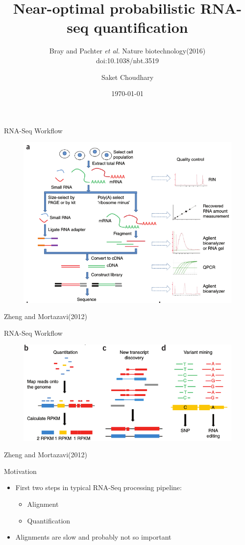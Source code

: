 \documentclass[10pt]{beamer}
\title{Near-optimal probabilistic
RNA-seq quantification}
\subtitle{Bray and Pachter \emph{et al.} Nature biotechnology(2016)\\ doi:10.1038/nbt.3519}
\date{\today}
\author{Saket Choudhary}
\institute{}
\begin{document}
\maketitle
\begin{frame}[fragile]{RNA-Seq Workflow}
\begin{figure}
\includegraphics[width=\textwidth]{rnaseq-a}
\end{figure}
\footnotesize{Zheng and Mortazavi(2012)}
\end{frame}

\begin{frame}[fragile]{RNA-Seq Workflow}
\begin{figure}
\includegraphics[width=\textwidth]{rnaseq-b}
\end{figure}
\footnotesize{Zheng and Mortazavi(2012)}
\end{frame}

\begin{frame}[fragile]{Motivation}

\begin{itemize}[<+-| alert@+>]
\item First two steps in typical RNA-Seq processing pipeline:
\begin{itemize}
\item Alignment
\item Quantification
\end{itemize}
\item Alignments are slow and probably not so important
\end{itemize}
\end{frame}
\end{document}
